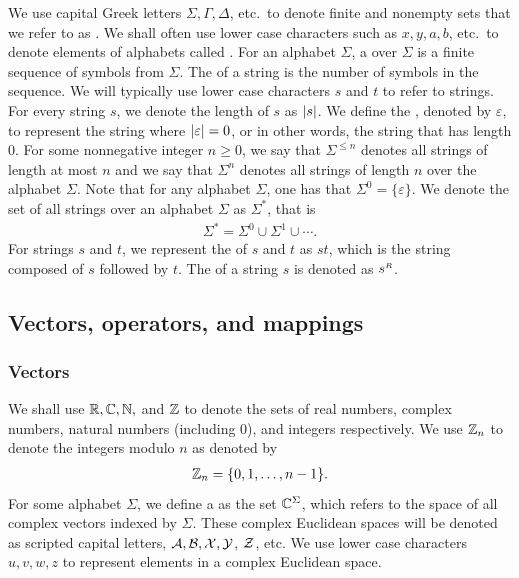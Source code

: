 We use capital Greek letters $\Sigma, \Gamma, \Delta$, etc.~to denote finite and nonempty sets that we refer to as . We shall often use lower case characters such as $x,y,a,b$, etc.~to denote elements of alphabets called . For an alphabet $\Sigma$, a  over $\Sigma$ is a finite sequence of symbols from $\Sigma$. The  of a string is the number of symbols in the sequence. We will typically use lower case characters $s$ and $t$ to refer to strings. For every string $s$, we denote the length of $s$ as $\left\lvert s \right\rvert$. We define the , denoted by $\varepsilon$, to represent the string where $\left\lvert \varepsilon \right\rvert = 0$, or in other words, the string that has length $0$. For some nonnegative integer $n \geq 0$, we say that $\Sigma^{\leq n}$ denotes all strings of length at most $n$ and we say that $\Sigma^n$ denotes all strings of length $n$ over the alphabet $\Sigma$. Note that for any alphabet $\Sigma$, one has that $\Sigma^0 = \{\varepsilon\}$. We denote the set of all strings over an alphabet $\Sigma$ as $\Sigma^{\ast}$, that is
\begin{align}
	\Sigma^{\ast} = \Sigma^0 \cup \Sigma^1 \cup \cdots .
\end{align}
For strings $s$ and $t$, we represent the  of $s$ and $t$ as $st$, which is the string composed of $s$ followed by $t$. The  of a string $s$ is denoted as $s^{\mathsmaller{R}}$.

\subsection{Vectors, operators, and mappings} 

\subsubsection*{Vectors}

We shall use $\mathbb{R}, \mathbb{C}, \mathbb{N},$ and $\mathbb{Z}$ to denote the sets of real numbers, complex numbers, natural numbers (including $0$), and integers respectively. We use $\mathbb{Z}_n$ to denote the integers modulo $n$ as denoted by
\begin{align}
	\mathbb{Z}_n = \{ 0, 1, \ldots, n-1 \}.
\end{align}
For some alphabet $\Sigma$, we define a  as the set $\mathbb{C}^{\Sigma}$, which refers to the space of all complex vectors indexed by $\Sigma$. These complex Euclidean spaces will be denoted as scripted capital letters, $\mathcal{A}, \mathcal{B}, \mathcal{X}, \mathcal{Y}$, $\mathcal{Z}$, etc. We use lower case characters $u,v,w,z$ to represent elements in a complex Euclidean space. 

